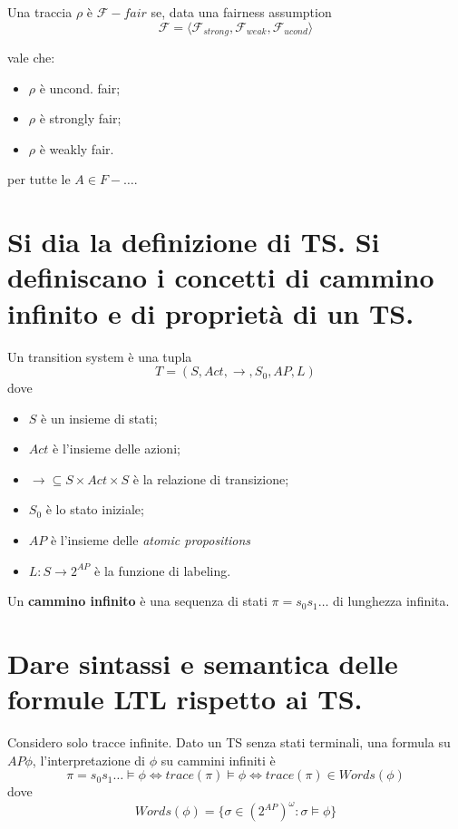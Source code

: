 \documentclass[a4paper,11pt]{article}
\begin{document}
	Una traccia $\rho$ è $\mathcal{F}-fair$ se, data una fairness assumption \[ \mathcal{F} =\langle \mathcal{F}_{strong}, \mathcal{F}_{weak}, \mathcal{F}_{ucond} \rangle \]

	vale che: \begin{itemize}
		\item $\rho$ è uncond. fair;
		\item $\rho$ è strongly fair;
		\item $\rho$ è  weakly fair.
	\end{itemize}

	per tutte le $A \in F-\dots$.

	\section{Si dia la definizione di TS. Si definiscano i concetti di cammino infinito e di proprietà di un TS.}

	Un transition system è una tupla \[ T = (S, Act, \rightarrow, S_0, AP, L) \]
	dove \begin{itemize}
		\item $S$ è un insieme di stati;
		\item $Act$ è l'insieme delle azioni;
		\item $\rightarrow \subseteq S \times Act \times S$ è la relazione di transizione;
		\item $S_0$ è lo stato iniziale;
		\item $AP$ è l'insieme delle \textit{atomic propositions}
		\item $L:S \to 2^{AP}$ è la funzione di labeling.
	\end{itemize}

	Un \textbf{cammino infinito} è una sequenza di stati $\pi = s_0s_1\dots$ di lunghezza infinita.

	\section{Dare sintassi e semantica delle formule LTL rispetto ai TS.}
	Considero solo tracce infinite. Dato un TS senza stati terminali, una formula su $AP \phi$, l'interpretazione di $\phi$ su cammini infiniti è \[ \pi = s_0s_1 \dots \models \phi \iff trace(\pi) \models \phi \iff trace(\pi) \in Words(\phi) \]
	dove \[ Words(\phi) = \lbrace \sigma \in (2^{AP})^\omega : \sigma \models \phi\rbrace \]	
\end{document}
